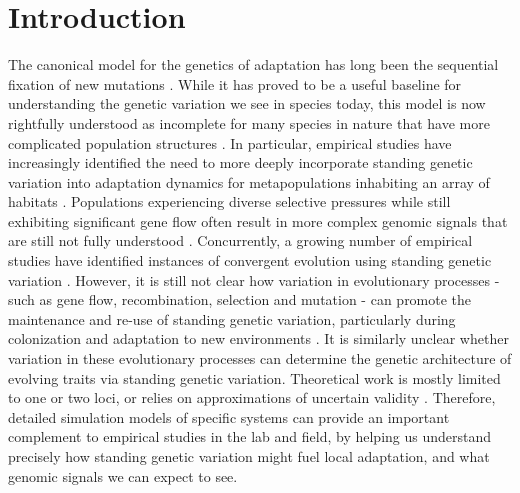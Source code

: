 \documentclass{article}
\begin{document}
\section*{Introduction}

The canonical model for the genetics of adaptation has long been the sequential fixation of new mutations 
\citep{smith_haigh_1974, Endler_1977, Orr_2005}.
While it has proved to be a useful baseline for understanding the genetic variation we see in species today, this model is now rightfully understood as incomplete for many species in nature that have more complicated population structures 
\citep{Lai2152, Schrider2017}. 
In particular, empirical studies have increasingly identified the need to more deeply incorporate standing genetic variation into adaptation dynamics for metapopulations inhabiting an array of habitats 
\citep{Hermisson_2008, Barrett2008}. 
Populations experiencing diverse selective pressures while still exhibiting significant gene flow often result in more complex genomic signals that are still not fully understood 
\citep{Charlesworth_1997, Charlesworth_2003, Nosil_2009, Flaxman_2013, Samuk_2017}. 
Concurrently, a growing number of empirical studies have identified instances of convergent evolution using standing genetic variation 
\citep{Schrider2017, Barrett2008, Nelson_2018, Nelson_2019, Bassham_2018}. 
However, it is still not clear how variation in evolutionary processes - such as gene flow, recombination, selection and mutation -  can promote the maintenance and re-use of standing genetic variation, particularly during colonization and adaptation to new environments
\citep{Nelson_2018, Pritchard_2010, yeaman2011genetic, Schrider2017}. 
It is similarly unclear whether variation in these evolutionary processes can determine the genetic architecture of evolving traits via standing genetic variation. 
Theoretical work is mostly limited to one or two loci, or relies on approximations of uncertain validity
\citep[e.g.,][]{slatkin1975selection,petry1983effect,barton1986barrier,yeaman2011genetic,ralph2015standing}.
Therefore, detailed simulation models of specific systems can 
provide an important complement to empirical studies in the lab and field,
by helping us understand precisely how standing genetic variation might fuel local adaptation,
and what genomic signals we can expect to see.
\end{document}
